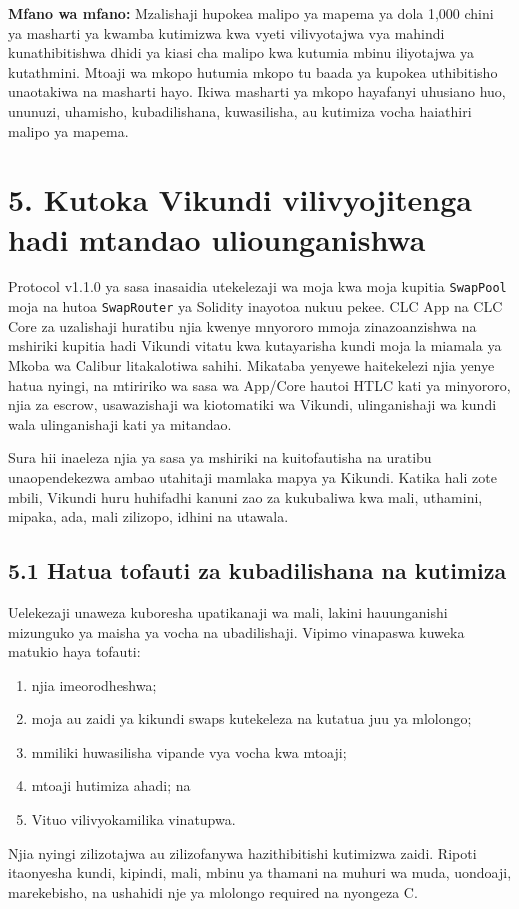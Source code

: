 \documentclass[11pt]{article}
\begin{document}
\textbf{Mfano wa mfano:} Mzalishaji hupokea malipo ya mapema ya dola 1,000 chini ya masharti ya kwamba kutimizwa kwa vyeti vilivyotajwa vya mahindi kunathibitishwa dhidi ya kiasi cha malipo kwa kutumia mbinu iliyotajwa ya kutathmini. Mtoaji wa mkopo hutumia mkopo tu baada ya kupokea uthibitisho unaotakiwa na masharti hayo. Ikiwa masharti ya mkopo hayafanyi uhusiano huo, ununuzi, uhamisho, kubadilishana, kuwasilisha, au kutimiza vocha haiathiri malipo ya mapema.


\section*{5. Kutoka Vikundi vilivyojitenga hadi mtandao uliounganishwa}

Protocol v1.1.0 ya sasa inasaidia utekelezaji wa moja kwa moja kupitia \texttt{SwapPool} moja na hutoa \texttt{SwapRouter} ya Solidity inayotoa nukuu pekee. CLC App na CLC Core za uzalishaji huratibu njia kwenye mnyororo mmoja zinazoanzishwa na mshiriki kupitia hadi Vikundi vitatu kwa kutayarisha kundi moja la miamala ya Mkoba wa Calibur litakalotiwa sahihi. Mikataba yenyewe haitekelezi njia yenye hatua nyingi, na mtiririko wa sasa wa App/Core hautoi HTLC kati ya minyororo, njia za escrow, usawazishaji wa kiotomatiki wa Vikundi, ulinganishaji wa kundi wala ulinganishaji kati ya mitandao.

Sura hii inaeleza njia ya sasa ya mshiriki na kuitofautisha na uratibu unaopendekezwa ambao utahitaji mamlaka mapya ya Kikundi. Katika hali zote mbili, Vikundi huru huhifadhi kanuni zao za kukubaliwa kwa mali, uthamini, mipaka, ada, mali zilizopo, idhini na utawala.

\subsection*{5.1 Hatua tofauti za kubadilishana na kutimiza}

Uelekezaji unaweza kuboresha upatikanaji wa mali, lakini hauunganishi mizunguko ya maisha ya vocha na ubadilishaji. Vipimo vinapaswa kuweka matukio haya tofauti:

\begin{enumerate}[leftmargin=*]
\item njia imeorodheshwa;
\item moja au zaidi ya kikundi swaps kutekeleza na kutatua juu ya mlolongo;
\item mmiliki huwasilisha vipande vya vocha kwa mtoaji;
\item mtoaji hutimiza ahadi; na
\item Vituo vilivyokamilika vinatupwa.
\end{enumerate}
Njia nyingi zilizotajwa au zilizofanywa hazithibitishi kutimizwa zaidi. Ripoti itaonyesha kundi, kipindi, mali, mbinu ya thamani na muhuri wa muda, uondoaji, marekebisho, na ushahidi nje ya mlolongo required na nyongeza C.
\end{document}
